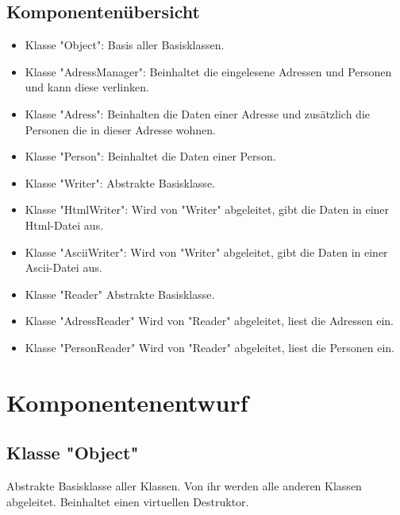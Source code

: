 \documentclass[12pt,a4paper]{article}
\begin{document}
\subsection {Komponentenübersicht}
\begin {itemize} 
	\item Klasse "Object":
	\newline
	Basis aller Basisklassen.
	\item Klasse "AdressManager":
	\newline
	Beinhaltet die eingelesene Adressen und Personen und kann diese verlinken.
	\item Klasse "Adress":
	\newline	
	Beinhalten die Daten einer Adresse und zusätzlich die Personen die in dieser Adresse wohnen.
	\item Klasse "Person":
	\newline
	Beinhaltet die Daten einer Person.
	\item Klasse "Writer":
	\newline
	Abstrakte Basisklasse.
	\item Klasse "HtmlWriter": 
	\newline
	Wird von "Writer" abgeleitet, gibt die Daten in einer Html-Datei aus.
	\item Klasse "AsciiWriter":
	\newline
	Wird von "Writer" abgeleitet, gibt die Daten in einer Ascii-Datei aus.
	\item Klasse "Reader"
	\newline
	Abstrakte Basisklasse.
	\item Klasse "AdressReader"
	\newline
	Wird von "Reader" abgeleitet, liest die Adressen ein.
	\item Klasse "PersonReader"
	\newline
	Wird von "Reader" abgeleitet, liest die Personen ein.
	
\end {itemize}

\newpage
\section {Komponentenentwurf}
\subsection {Klasse "Object"}
Abstrakte Basisklasse aller Klassen. Von ihr werden alle anderen Klassen abgeleitet. Beinhaltet einen virtuellen Destruktor.
\end{document}
